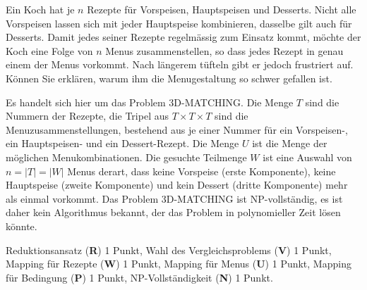 Ein Koch hat je $n$ Rezepte für Vorspeisen, Hauptspeisen und Desserts.
Nicht alle Vorspeisen lassen sich mit jeder Hauptspeise kombinieren,
dasselbe gilt auch für Desserts.
Damit jedes seiner Rezepte regelmässig zum Einsatz kommt, möchte der
Koch eine Folge von $n$ Menus zusammenstellen, so dass jedes Rezept
in genau einem der Menus vorkommt.
Nach längerem tüfteln gibt er jedoch frustriert auf.
Können Sie erklären, warum ihm die Menugestaltung so schwer gefallen ist.


\begin{loesung}
Es handelt sich hier um das Problem 3D-MATCHING.
Die Menge $T$ sind die Nummern der Rezepte, die Tripel aus $T\times T\times T$
sind die Menuzusammenstellungen, bestehend aus je einer Nummer für
ein Vorspeisen-, ein Hauptspeisen- und ein Dessert-Rezept.
Die Menge $U$ ist die Menge der möglichen Menukombinationen.
Die gesuchte Teilmenge $W$ ist eine Auswahl von $n=|T|=|W|$ Menus
derart, dass keine Vorspeise (erste Komponente), keine Hauptspeise
(zweite Komponente) und kein Dessert (dritte Komponente) mehr als
einmal vorkommt.
Das Problem 3D-MATCHING ist NP-vollständig, es ist daher kein
Algorithmus bekannt, der das Problem in polynomieller Zeit lösen könnte.
\end{loesung}

\begin{bewertung}
Reduktionsansatz ({\bf R}) 1 Punkt,
Wahl des Vergleichsproblems ({\bf V}) 1 Punkt,
Mapping für Rezepte ({\bf W}) 1 Punkt,
Mapping für Menus ({\bf U}) 1 Punkt,
Mapping für Bedingung ({\bf P}) 1 Punkt,
NP-Vollständigkeit ({\bf N}) 1 Punkt.
\end{bewertung}



